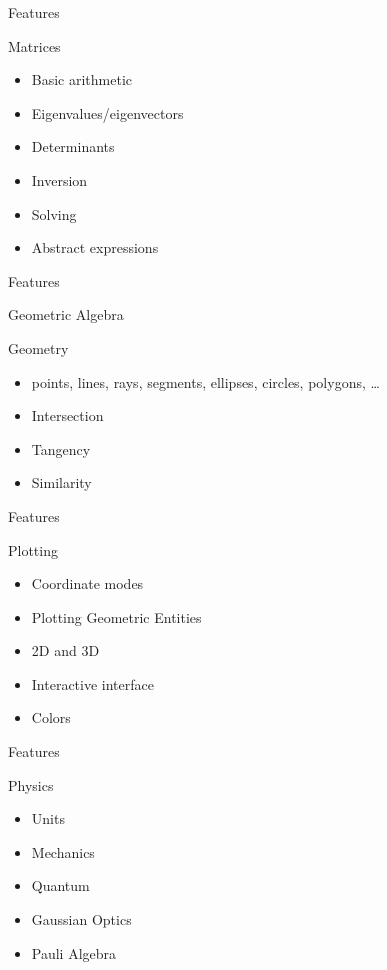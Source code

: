 \documentclass[xcolor=svgnames]{beamer}
\begin{document}
\begin{frame}{Features}
  \begin{block}{Matrices}
    \begin{itemize}
    \item Basic arithmetic
    \item Eigenvalues/eigenvectors
    \item Determinants
    \item Inversion
    \item Solving
    \item Abstract expressions
    \end{itemize}
  \end{block}
\end{frame}

\begin{frame}{Features}
  \begin{block}{Geometric Algebra}
  \end{block}

  \begin{block}{Geometry}
    \begin{itemize}
    \item points, lines, rays, segments, ellipses, circles, polygons, \ldots
    \item Intersection
    \item Tangency
    \item Similarity
    \end{itemize}
  \end{block}
\end{frame}

\begin{frame}{Features}
  \begin{block}{Plotting}
    \begin{itemize}
    \item Coordinate modes
    \item Plotting Geometric Entities
    \item 2D and 3D
    \item Interactive interface
    \item Colors
    \end{itemize}
  \end{block}
\end{frame}

\begin{frame}{Features}
  \begin{block}{Physics}
    \begin{itemize}
    \item Units
    \item Mechanics
    \item Quantum
    \item Gaussian Optics
    \item Pauli Algebra
    \end{itemize}
  \end{block}
\end{frame}
\end{document}
